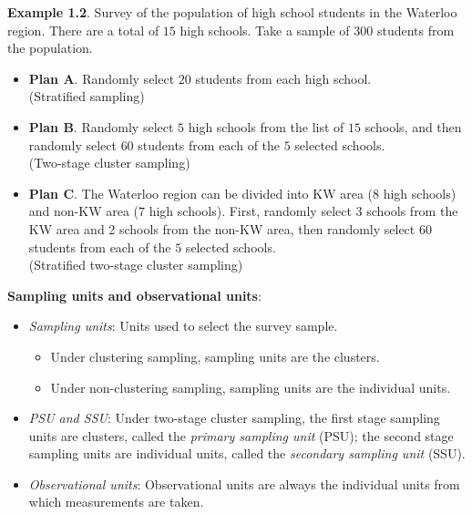 \textbf{Example 1.2}. Survey of the population of high school students in the
Waterloo region. There are a total of $15$ high schools. Take a sample
of $300$ students from the population.
\begin{itemize}
      \item \textbf{Plan A}. Randomly select $20$ students from each high school.\\
            (Stratified sampling)
      \item \textbf{Plan B}. Randomly select $5$ high schools from the list of $15$ schools,
            and then randomly select $60$ students from each of the $5$ selected
            schools.\\
            (Two-stage cluster sampling)
      \item \textbf{Plan C}. The Waterloo region can be divided into KW area ($8$ high
            schools) and non-KW area ($7$ high schools). First, randomly select $3$
            schools from the KW area and 2 schools from the non-KW area, then
            randomly select $60$ students from each of the $5$ selected schools.\\
            (Stratified two-stage cluster sampling)
\end{itemize}

\textbf{Sampling units and observational units}:
\begin{itemize}
      \item \emph{Sampling units}: Units used to select the survey sample.
            \begin{itemize}
                  \item Under clustering sampling, sampling units are the clusters.
                  \item Under non-clustering sampling, sampling units are the individual
                        units.
            \end{itemize}
      \item \emph{PSU and SSU}: Under two-stage cluster sampling, the first stage
            sampling units are clusters, called the \emph{primary sampling unit}
            (PSU); the second stage sampling units are individual units,
            called the \emph{secondary sampling unit} (SSU).
      \item \emph{Observational units}: Observational units are always the individual units from which
            measurements are taken.
\end{itemize}

